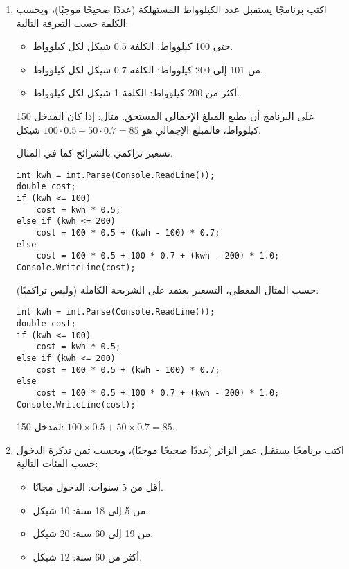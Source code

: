\documentclass[12pt]{article}
\begin{document}
\begin{enumerate}[itemsep=2em]
\item
اكتب برنامجًا يستقبل عدد الكيلوواط المستهلكة (عددًا صحيحًا موجبًا)، ويحسب الكلفة حسب التعرفة التالية:

\begin{itemize}
  \item حتى 100 كيلوواط: الكلفة $0.5$ شيكل لكل كيلوواط.
  \item من 101 إلى 200 كيلوواط: الكلفة $0.7$ شيكل لكل كيلوواط.
  \item أكثر من 200 كيلوواط: الكلفة 1 شيكل لكل كيلوواط.
\end{itemize}

على البرنامج أن يطبع المبلغ الإجمالي المستحق.
مثال: إذا كان المدخل 150 كيلوواط، فالمبلغ الإجمالي هو $100 \cdot 0.5 + 50 \cdot 0.7 = 85$ شيكل.

\ifwithsols
\begin{boxSolution}
تسعير تراكمي بالشرائح كما في المثال.
\begin{english}
\begin{verbatim}
int kwh = int.Parse(Console.ReadLine());
double cost;
if (kwh <= 100)
    cost = kwh * 0.5;
else if (kwh <= 200)
    cost = 100 * 0.5 + (kwh - 100) * 0.7;
else
    cost = 100 * 0.5 + 100 * 0.7 + (kwh - 200) * 1.0;
Console.WriteLine(cost);
\end{verbatim}
\end{english}
\end{boxSolution}
\fi

\ifwithsols
\begin{boxSolution}
حسب المثال المعطى، التسعير يعتمد على الشريحة الكاملة (وليس تراكميًا):
\begin{english}
\begin{verbatim}
int kwh = int.Parse(Console.ReadLine());
double cost;
if (kwh <= 100)
    cost = kwh * 0.5;
else if (kwh <= 200)
    cost = 100 * 0.5 + (kwh - 100) * 0.7;
else
    cost = 100 * 0.5 + 100 * 0.7 + (kwh - 200) * 1.0;
Console.WriteLine(cost);
\end{verbatim}
\end{english}
لمدخل \textenglish{150}: \(100\times 0.5 + 50\times 0.7 = 85\).
\end{boxSolution}
\fi

\item
اكتب برنامجًا يستقبل عمر الزائر (عددًا صحيحًا موجبًا)، ويحسب ثمن تذكرة الدخول حسب الفئات التالية:

\begin{itemize}
  \item أقل من 5 سنوات: الدخول مجانًا.
  \item من 5 إلى 18 سنة: 10 شيكل.
  \item من 19 إلى 60 سنة: 20 شيكل.
  \item أكثر من 60 سنة: 12 شيكل.
\end{itemize}


\end{enumerate}
\end{document}
